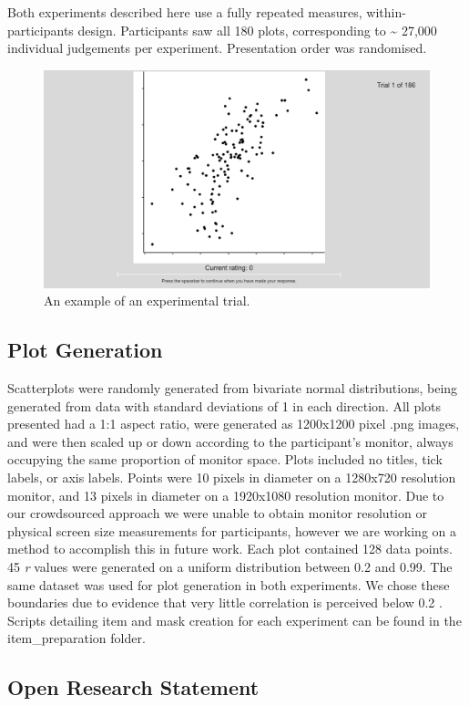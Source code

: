 \documentclass[preprint, 3p,
authoryear]{elsarticle} %
\begin{document}
Both experiments described here use a fully repeated measures,
within-participants design. Participants saw all 180 plots,
corresponding to \textasciitilde{} 27,000 individual judgements per
experiment. Presentation order was randomised.

\begin{figure}

\includegraphics[width=0.5\linewidth]{images/example-trial} \hfill{}

\caption{\label{example-trial}An example of an experimental trial.}\label{fig:example-trial}
\end{figure}

\hypertarget{plot-generation}{%
\subsection{Plot Generation}\label{plot-generation}}

Scatterplots were randomly generated from bivariate normal
distributions, being generated from data with standard deviations of 1
in each direction. All plots presented had a 1:1 aspect ratio, were
generated as 1200x1200 pixel .png images, and were then scaled up or
down according to the participant's monitor, always occupying the same
proportion of monitor space. Plots included no titles, tick labels, or
axis labels. Points were 10 pixels in diameter on a 1280x720 resolution
monitor, and 13 pixels in diameter on a 1920x1080 resolution monitor.
Due to our crowdsourced approach we were unable to obtain monitor
resolution or physical screen size measurements for participants,
however we are working on a method to accomplish this in future work.
Each plot contained 128 data points. 45 \emph{r} values were generated
on a uniform distribution between 0.2 and 0.99. The same dataset was
used for plot generation in both experiments. We chose these boundaries
due to evidence that very little correlation is perceived below 0.2
\citep{bobko_1979, cleveland_1982, strahan_1978}. Scripts detailing item
and mask creation for each experiment can be found in the
item\_preparation folder.

\hypertarget{open-research-statement}{%
\subsection{Open Research Statement}\label{open-research-statement}}
\end{document}
